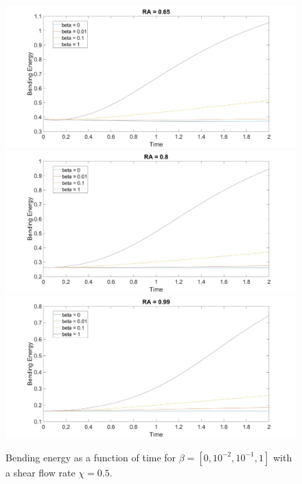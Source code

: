 \documentclass[aps,prl,showpacs]{revtex4}
\begin{document}
 \begin{figure}
 	\centering
 	\includegraphics[width=.9\textwidth]{figures/BE4.jpg}
 	\includegraphics[width=.9\textwidth]{figures/BE5.jpg}
 	\includegraphics[width=.9\textwidth]{figures/BE6.jpg}
 	\caption{Bending energy as a function of time for $\beta = [0, 10^{-2},10^{-1}, 1]$ with a shear flow rate $\chi = 0.5$.}
 \end{figure}
 
\end{document}
